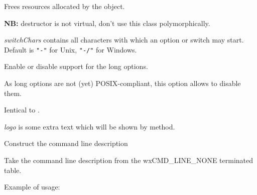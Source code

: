 
Frees resources allocated by the object.

{\bf NB:} destructor is not virtual, don't use this class polymorphically.

\label{wxcmdlineparsersetswitchchars}


{\it switchChars} contains all characters with which an option or switch may
start. Default is {\tt "-"} for Unix, {\tt "-/"} for Windows.

\label{wxcmdlineparserenablelongoptions}


Enable or disable support for the long options.

As long options are not (yet) POSIX-compliant, this option allows to disable
them.



\label{wxcmdlineparserdisablelongoptions}


Ientical to .

\label{wxcmdlineparsersetlogo}


{\it logo} is some extra text which will be shown by 
 method.

\label{wxcmdlineparsersetdesc}


Construct the command line description

Take the command line description from the wxCMD\_LINE\_NONE terminated table.

Example of usage:

